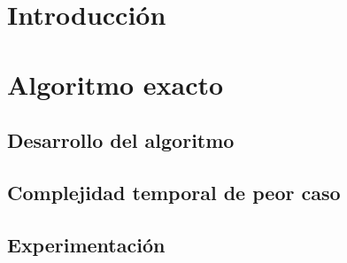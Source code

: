 \documentclass[a4paper, 10pt, twoside]{article}
\begin{document}
\newpage



\tableofcontents

\newpage



\section{Introducción}
\label{sec:introduccion}


\newpage



\section{Algoritmo exacto}
\label{sec:algoritmo-exacto}

  \subsection{Desarrollo del algoritmo}
  \label{sub:algoritmo-exacto-desarrollo}
  

  \subsection{Complejidad temporal de peor caso}
  \label{sub:algoritmo-exacto-complejidad}
  

  \subsection{Experimentación}
  \label{sub:algoritmo-exacto-experimentacion}
  

\newpage


\end{document}
